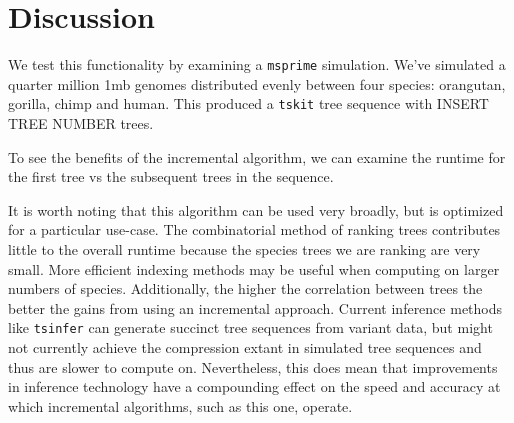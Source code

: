 \documentclass{article}
\newcommand{\tskit}{{\texttt{tskit}}}
\newcommand{\tsinfer}{{\texttt{tsinfer}}}
\newcommand{\msprime}{{\texttt{msprime}}}
\begin{document}
\section{Discussion}
We test this functionality by examining a \msprime{} simulation. We've simulated
a quarter million 1mb genomes distributed evenly between four species: orangutan,
gorilla, chimp and human. This produced a \tskit{} tree sequence with
INSERT TREE NUMBER trees.

To see the benefits of the incremental algorithm, we can examine the runtime for
the first tree vs the subsequent trees in the sequence.

It is worth noting that this algorithm can be used very broadly, but is optimized
for a particular use-case. The combinatorial method of ranking trees contributes
little to the overall runtime because the species trees we are ranking are very
small. More efficient indexing methods may be useful when computing on larger
numbers of species. Additionally, the higher the correlation between trees the
better the gains from using an incremental approach. Current inference methods
like \tsinfer{} can generate succinct tree sequences from variant data, but might
not currently achieve the compression extant in simulated tree sequences and thus
are slower to compute on. Nevertheless, this does mean that improvements in
inference technology have a compounding effect on the speed and accuracy
at which incremental algorithms, such as this one, operate.
\end{document}

